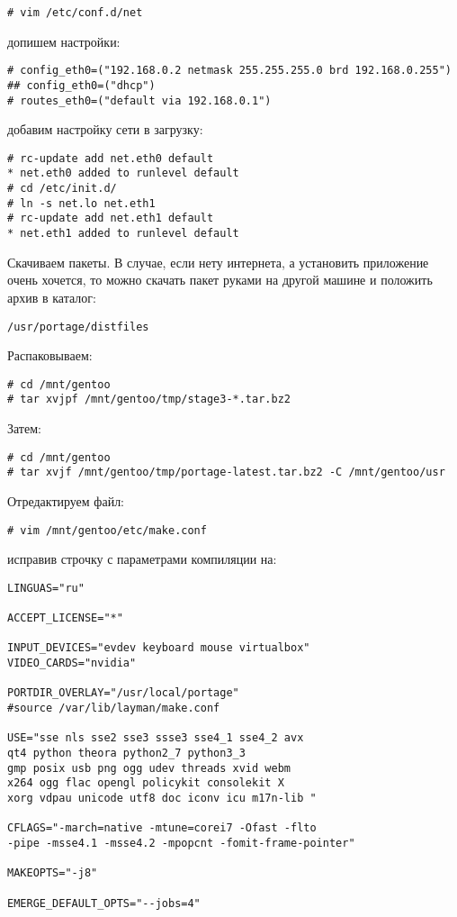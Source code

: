 \documentclass[10pt, a4paper]{article}
\begin{document}
\begin{verbatim}
# vim /etc/conf.d/net
\end{verbatim}

допишем настройки:

\begin{verbatim}
# config_eth0=("192.168.0.2 netmask 255.255.255.0 brd 192.168.0.255")
## config_eth0=("dhcp")
# routes_eth0=("default via 192.168.0.1")
\end{verbatim}

добавим настройку сети в загрузку:

\begin{verbatim}
# rc-update add net.eth0 default
* net.eth0 added to runlevel default
# cd /etc/init.d/
# ln -s net.lo net.eth1
# rc-update add net.eth1 default
* net.eth1 added to runlevel default
\end{verbatim}

Скачиваем пакеты. 
В случае, если нету интернета, а установить приложение очень хочется, то можно скачать пакет руками на другой машине и положить архив в каталог:
\begin{verbatim}
/usr/portage/distfiles
\end{verbatim}

Распаковываем:

\begin{verbatim}
# cd /mnt/gentoo
# tar xvjpf /mnt/gentoo/tmp/stage3-*.tar.bz2
\end{verbatim}

Затем:

\begin{verbatim}
# cd /mnt/gentoo
# tar xvjf /mnt/gentoo/tmp/portage-latest.tar.bz2 -C /mnt/gentoo/usr
\end{verbatim}

Отредактируем файл:

\begin{verbatim}
# vim /mnt/gentoo/etc/make.conf
\end{verbatim}

исправив строчку с параметрами компиляции на:

\begin{verbatim}
LINGUAS="ru"

ACCEPT_LICENSE="*"

INPUT_DEVICES="evdev keyboard mouse virtualbox" 
VIDEO_CARDS="nvidia"

PORTDIR_OVERLAY="/usr/local/portage"
#source /var/lib/layman/make.conf

USE="sse nls sse2 sse3 ssse3 sse4_1 sse4_2 avx
qt4 python theora python2_7 python3_3 
gmp posix usb png ogg udev threads xvid webm  
x264 ogg flac opengl policykit consolekit X  
xorg vdpau unicode utf8 doc iconv icu m17n-lib "

CFLAGS="-march=native -mtune=corei7 -Ofast -flto 
-pipe -msse4.1 -msse4.2 -mpopcnt -fomit-frame-pointer"

MAKEOPTS="-j8"

EMERGE_DEFAULT_OPTS="--jobs=4"

\end{verbatim}
\end{document}
